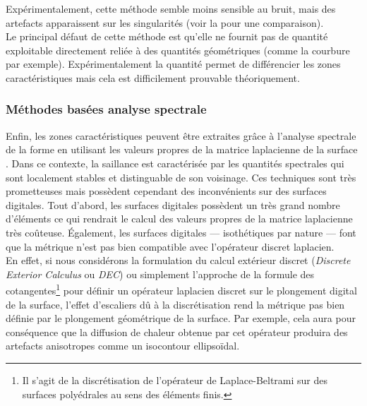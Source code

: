 %
Expérimentalement, cette méthode semble moins sensible au bruit, mais des
artefacts apparaissent sur les singularités (voir la
 pour une comparaison).
%
\\
%
Le principal défaut de cette méthode est qu'elle ne fournit pas de quantité
exploitable directement reliée à des quantités géométriques (comme la courbure
par exemple). Expérimentalement la quantité permet de différencier les zones
caractéristiques mais cela est difficilement prouvable théoriquement.
%
\subsubsection{Méthodes basées analyse spectrale}%
\label{sec:applications:feature:spectral}
%
Enfin, les zones caractéristiques peuvent être extraites grâce à l'analyse
spectrale de la forme en utilisant les valeurs propres de la matrice laplacienne
de la surface \cite{GebalBAL09,Sun2009,Song2014}. Dans ce contexte, la saillance
est caractérisée par les quantités spectrales qui sont localement stables et
distinguable de son voisinage. Ces techniques sont très prometteuses mais
possèdent cependant des inconvénients sur des surfaces digitales. Tout d'abord,
les surfaces digitales possèdent un très grand nombre d'éléments ce qui rendrait
le calcul des valeurs propres de la matrice laplacienne très coûteuse.
Également, les surfaces digitales --- isothétiques par nature --- font que la
métrique n'est pas bien compatible avec l'opérateur discret laplacien.
%
\\
%
En effet, si nous considérons la formulation du calcul extérieur discret
(\emph{Discrete Exterior Calculus} ou \emph{DEC}) ou simplement l'approche de la
formule des cotangentes\footnote{Il s'agit de la discrétisation de l'opérateur
de Laplace-Beltrami sur des surfaces polyédrales au sens des éléments finis.}
pour définir un opérateur laplacien discret sur le plongement digital de la
surface, l'effet d'escaliers dû à la discrétisation rend la métrique pas bien
définie par le plongement géométrique de la surface. Par exemple, cela aura pour
conséquence que la diffusion de chaleur obtenue par cet opérateur produira des
artefacts anisotropes comme un isocontour ellipsoïdal.
%
